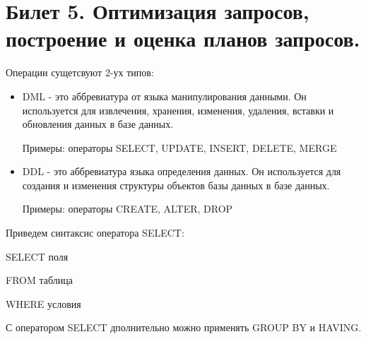 \newpage
\section {Билет 5. Оптимизация запросов, построение и оценка планов запросов.}

Операции сущетсвуют 2-ух типов: 
\begin{itemize}
    \item DML - это аббревиатура от языка манипулирования данными. Он используется для извлечения, хранения, изменения, удаления, вставки и обновления данных в базе данных.

Примеры: операторы SELECT, UPDATE, INSERT, DELETE, MERGE

\item DDL - это аббревиатура языка определения данных. Он используется для создания и изменения структуры объектов базы данных в базе данных.

Примеры: операторы CREATE, ALTER, DROP
\end{itemize}

Приведем синтаксис оператора SELECT: 

SELECT поля

FROM таблица 

WHERE условия 

С оператором SELECT дполнительно можно применять GROUP BY и HAVING.  
\\[10pt]

